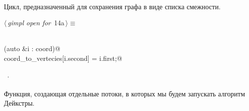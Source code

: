 \documentclass[12pt]{article}
\begin{document}
\paragraph{}
Цикл, предназначенный для сохранения графа в виде списка смежности.

\begin{flushleft} \small
\begin{minipage}{\linewidth}\label{scrap25}\raggedright\small
{} $\langle\,${\itshape gimpl open for}\nobreak\ {\footnotesize {14a}}$\,\rangle\equiv$
\vspace{-1ex}
\begin{list}{}{} \item
\mbox{}\verb@@\\
\mbox{}\verb@for (auto &i : coord)@\\
\mbox{}\verb@    coord_to_vertecies[i.second] = i.first;@\\
\mbox{}\verb@@{\NWsep}
\end{list}
\vspace{-1.5ex}
\footnotesize
\begin{list}{}{\setlength{\itemsep}{-\parsep}\setlength{\itemindent}{-\leftmargin}}
\item \NWtxtMacroRefIn\ .

\item{}
\end{list}
\end{minipage}\vspace{4ex}
\end{flushleft}
\paragraph{}
Функция, создающая отдельные потоки, в которых мы будем запускать алгоритм Дейкстры.
\end{document}
